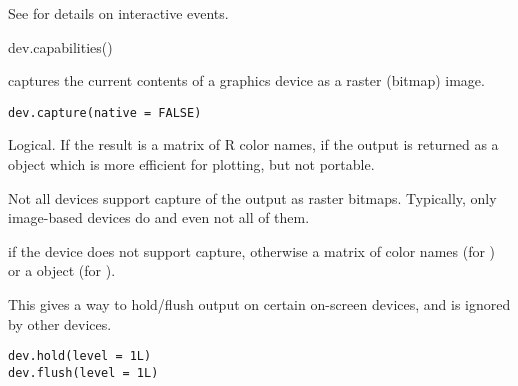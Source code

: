 %
\begin{SeeAlso}\relax
See  for details on interactive events.
\end{SeeAlso}
%
\begin{Examples}
\begin{ExampleCode}
dev.capabilities()
\end{ExampleCode}
\end{Examples}
%
\begin{Description}\relax
{} captures the current contents of a graphics device
as a raster (bitmap) image.
\end{Description}
%
\begin{Usage}
\begin{verbatim}
dev.capture(native = FALSE)
\end{verbatim}
\end{Usage}
%
\begin{Arguments}
\begin{ldescription}
\item[\code{native}] Logical. If  the result is a matrix of R
color names, if  the output is returned as a
 object which is more efficient for plotting, but
not portable.
\end{ldescription}
\end{Arguments}
%
\begin{Details}\relax
Not all devices support capture of the output as raster bitmaps.
Typically, only image-based devices do and even not all of them.
\end{Details}
%
\begin{Value}
 if the device does not support capture, otherwise a
matrix of color names (for ) or a
 object (for ).
\end{Value}
%
\begin{Description}\relax
This gives a way to hold/flush output on certain on-screen devices,
and is ignored by other devices.
\end{Description}
%
\begin{Usage}
\begin{verbatim}
dev.hold(level = 1L)
dev.flush(level = 1L)
\end{verbatim}
\end{Usage}
